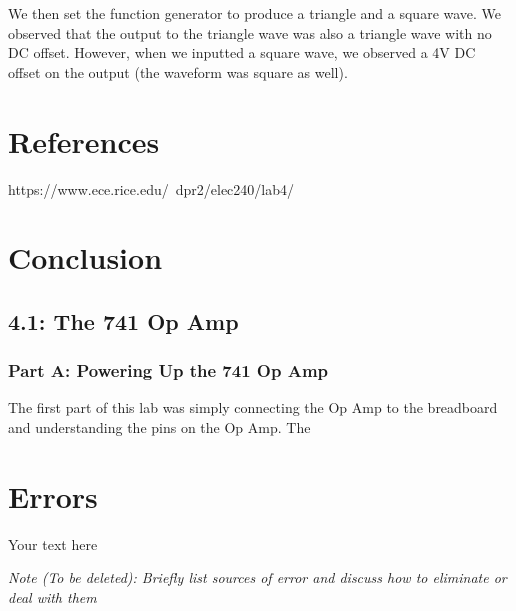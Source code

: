 \documentclass[10pt]{article}
\begin{document}
\quad We then set the function generator to produce a triangle and a square wave. We observed that the output to the triangle wave was also a triangle wave with no DC offset. However, when we inputted a square wave, we observed a 4V DC offset on the output (the waveform was square as well). 


\section{References}

https://www.ece.rice.edu/~dpr2/elec240/lab4/

\section{Conclusion}

\subsection{4.1: The 741 Op Amp}
\subsubsection{Part A: Powering Up the 741 Op Amp}
The first part of this lab was simply connecting the Op Amp to the breadboard and understanding the pins on the Op Amp. The 
\section{Errors}

Your text here

\medskip

\textit{Note (To be deleted): Briefly list sources of error and discuss how to eliminate or deal with them}
\end{document}
